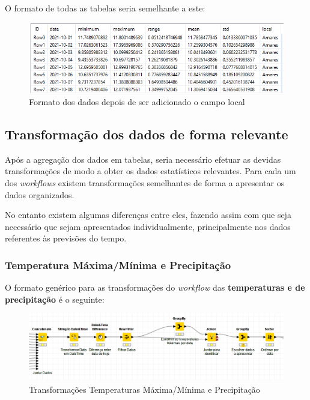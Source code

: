 O formato de todas as tabelas seria semelhante a este:

\begin{figure}[H]
    \centering
    \includegraphics[scale=0.7]{imagens/localFormat.png}
    \caption{Formato dos dados depois de ser adicionado o campo local}
\end{figure}

\subsection*{Transformação dos dados de forma relevante}

Após a agregação dos dados em tabelas, seria necessário efetuar as devidas transformações de modo a obter os dados estatísticos relevantes. Para cada um dos \textit{workflows} existem transformações semelhantes de forma a apresentar os dados organizados. 

No entanto existem algumas diferenças entre eles, fazendo assim com que seja necessário que sejam apresentados individualmente, principalmente nos dados referentes às previsões do tempo.

\subsubsection*{Temperatura Máxima/Mínima e Precipitação}

O formato genérico para as transformações do \textit{workflow} das \textbf{temperaturas e de precipitação} é o seguinte:

\begin{figure}[H]
    \includegraphics[scale=0.5]{imagens/TranformationGenericFormat.png}
    \caption{Transformações Temperaturas Máxima/Mínima e Precipitação}
\end{figure}

